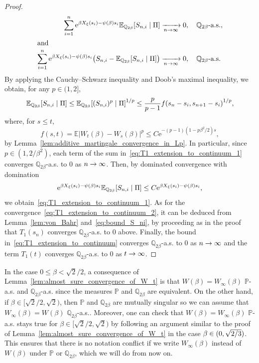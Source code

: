 \documentclass[AHL,Unicode,longabstracts,published]{cedram}
\newcommand{\e}{\mathrm{e}}
\newcommand{\E}{\mathbb{E}}
\renewcommand{\P}{\mathbb{P}}
\newcommand{\Q}{\mathbb{Q}}
\newcommand\1{\mathds{1}}
\let\originalleft\left
\let\originalright\right
\renewcommand{\left}{\mathopen{}\mathclose\bgroup\originalleft}
\renewcommand{\right}{\aftergroup\egroup\originalright}
\renewcommand*{\to}{\mathchoice{\longrightarrow}{\rightarrow}{\rightarrow}{\rightarrow}}
\begin{document}
\begin{proof}
\begin{align}
\sum_{i = 1}^n \e^{\beta X_\xi(s_i) - \psi(\beta)s_i} \E_{\Q_{2\beta}} \left[S_{n, i} \mid \Pi \right] &\xrightarrow[n \to \infty]{} 0, \quad \Q_{2\beta}\text{-a.s.},\label{eq:T1_extension_to_continuum_1}
\\
\intertext{and}
\sum_{i = 1}^n \e^{\beta X_\xi(s_i) - \psi(\beta)s_i} \left(S_{n, i} - \E_{\Q_{2\beta}} \left[S_{n, i} \mid \Pi \right] \right) &\xrightarrow[n \to \infty]{} 0, \quad \Q_{2\beta}\text{-a.s.}\label{eq:T1_extension_to_continuum_2}
\end{align}
By applying the Cauchy--Schwarz inequality and Doob's maximal inequality, we obtain, for any $p \in (1,2]$,
\begin{equation}\label{eq:bound_S_ni}
\E_{\Q_{2\beta}} \left[S_{n, i} \mid \Pi \right]
\leq \E_{\Q_{2\beta}} \left[(S_{n, i})^p \mid \Pi \right]^{1/p}
\leq \frac{p}{p-1} f\left(s_n - s_i, s_{n+1} - s_i\right)^{1/p},
\end{equation}
where, for $s \leq t$,
\begin{equation*}
f(s, t) = \E|W_t(\beta) - W_s(\beta)|^p \leq C \e^{-(p - 1)(1 - p\beta^2/2)s},
\end{equation*}
by Lemma~\ref{lem:additive_martingale_convergence_in_Lp}. In particular, since $p \in (1, 2/\beta^2)$, each term of the sum in~\eqref{eq:T1_extension_to_continuum_1} converges $\Q_{2\beta}$-a.s. to $0$ as $n \to \infty$. Then, by dominated convergence with domination
\begin{equation*}
\e^{\beta X_\xi(s_i) - \psi(\beta)s_i} \E_{\Q_{2\beta}} \left[S_{n, i} \mid \Pi \right] \leq C \e^{\beta X_\xi(s_i) - \psi(\beta)s_i},
\end{equation*}
we obtain~\eqref{eq:T1_extension_to_continuum_1}. As for the convergence~\eqref{eq:T1_extension_to_continuum_2}, it can be deduced from Lemma~\ref{lem:von_Bahr} and~\eqref{eq:bound_S_ni}, by proceeding as in the proof that $T_1(s_n)$ converges $\Q_{2\beta}$-a.s. to $0$ above. Finally, the bound in~\eqref{eq:T1_extension_to_continuum} converges $\Q_{2\beta}$-a.s. to $0$ as $n \to \infty$ and the term $T_1(t)$ converges $\Q_{2\beta}$-a.s. to $0$ as $t \to \infty$.
\end{proof}

\begin{rema}\label{rem:W(beta)_vs_Winfty(beta)}
In the case $0 \leq \beta < \sqrt{2}/2$, a consequence of Lemma~\ref{lem:almost_sure_convergence_of_W_t} is that $W(\beta) = W_\infty(\beta)$ $\P$-a.s. and $\Q_{2\beta}$-a.s. since the measures $\P$ and $\Q_{2\beta}$ are equivalent. On the other hand, if $\beta \in [\sqrt{2}/2,\sqrt{2})$, then $\P$ and $\Q_{2\beta}$ are mutually singular so we can assume that $W_\infty(\beta) = W(\beta)$ $\Q_{2\beta}$-a.s.. Moreover, one can check that $W(\beta) = W_\infty(\beta)$ $\P$-a.s. stays true for $\beta \in [\sqrt{2}/2,\sqrt{2})$ by following an argument similar to the proof of Lemma~\ref{lem:almost_sure_convergence_of_W_t} in the case $\beta \in (0,\sqrt{2\smash{/}3})$. This ensures that there is no notation conflict if we write $W_\infty(\beta)$ instead of $W(\beta)$ under $\P$ or $\Q_{2\beta}$, which we will do from now on.
\end{rema}
\end{document}
